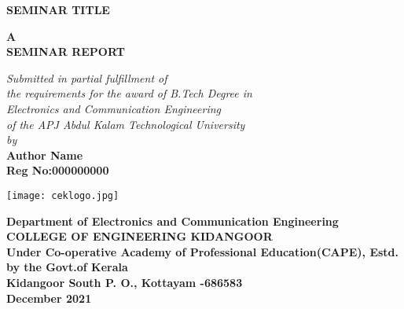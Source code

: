 \documentclass{scrartcl}
\begin{document}
\begin{center}
        \vspace*{0.1cm}
        
        \Large
        \textbf{\uppercase{Seminar Title}}
        
        \vspace{2cm}
        \normalsize
        \textbf{\uppercase{a\\seminar report}}      
        \vspace{1cm}
        
        \textit{        
        Submitted in partial fulfillment of\\
		the requirements for the award of B.Tech Degree in\\
		Electronics and Communication Engineering\\
		of the APJ Abdul Kalam Technological University\\
		\vspace{1.5cm}
		by \\}
		\vspace{1cm}
        \large
 		\textbf{Author Name}\\ 
 		\textbf{Reg No:000000000}     
        
        \vspace{4cm}
		\texttt{[image: ceklogo.jpg]} 
       
        \large 
        \textbf{
        Department of Electronics and Communication Engineering\\[0.5cm]
        \Large COLLEGE OF ENGINEERING KIDANGOOR\\
        \scriptsize Under Co-operative Academy of Professional Education(CAPE), Estd. by the Govt.of Kerala\\
        \large Kidangoor South P. O., Kottayam -686583\\
        December 2021}\\
        
        
        
    \end{center}
\end{document}
